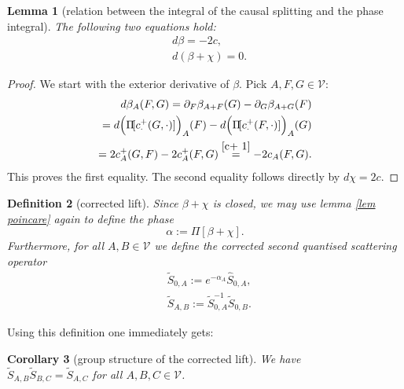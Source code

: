 \documentclass[b5paper,draft,openbib,12pt]{memoir}
\newtheorem{Def}{Definition}
\newtheorem{Lemma}[Def]{Lemma}
\newtheorem{Corollary}[Def]{Corollary}
\begin{document}
\begin{Lemma}[relation between the integral of the causal splitting and the phase integral]
The following two equations hold:
\begin{align}\label{beta c}
&d \beta=-2 c,\\
&d(\beta +\chi)=0.
\end{align}
\end{Lemma}
\begin{proof}
We start with the exterior derivative of \(\beta\). Pick \(A,F,G\in\mathcal{V}\):
\begin{align}
d\beta_A(F,G)=\partial_F \beta_{A+F}(G)-\partial_G \beta_{A+G}(F)\\
=d\Big(\Pi\![c^+_\cdot(G,\cdot)]\Big)_A(F)-d\Big(\Pi\![c^+_\cdot(F,\cdot)]\Big)_A(G)\\
=2 c^+_A(G,F)-2 c_A^+(F,G)\overset{\eqref{c+ 1}}{=}-2 c_A(F,G).
\end{align}
This proves the first equality. The second equality follows directly by \(d \chi=2 c\).
\end{proof}

\begin{Def}[corrected lift]
Since \(\beta+\chi\) is closed, we may use lemma \ref{lem poincare} again to define the phase
\begin{equation}\label{def alpha}
\alpha:=\Pi\![\beta+\chi].
\end{equation}
Furthermore, for all \(A,B\in\mathcal{V}\) we define the corrected second quantised scattering operator 
\begin{align}\label{eq def tilde S}
&\tilde{S}_{0,A}:=e^{-\alpha_A} \hat{S}_{0,A},\\
&\tilde{S}_{A,B}:=\tilde{S}^{-1}_{0,A}\tilde{S}_{0,B}.
\end{align}
\end{Def}

Using this definition one immediately gets:
\begin{Corollary}[group structure of the corrected lift]
We have\\
 \(\tilde{S}_{A,B} \tilde{S}_{B,C}=\tilde{S}_{A,C}\) for all \(A,B,C\in\mathcal{V}\).
\end{Corollary}
\end{document}
